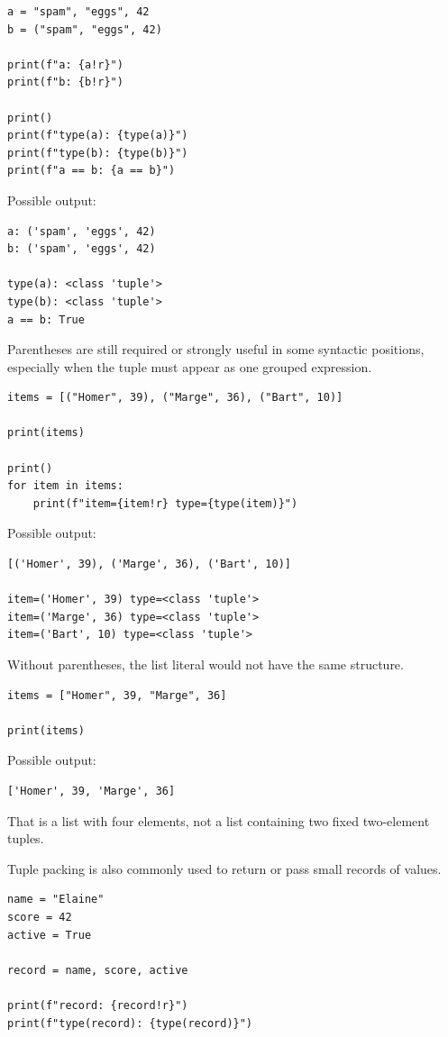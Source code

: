 \begin{verbatim}
a = "spam", "eggs", 42
b = ("spam", "eggs", 42)

print(f"a: {a!r}")
print(f"b: {b!r}")

print()
print(f"type(a): {type(a)}")
print(f"type(b): {type(b)}")
print(f"a == b: {a == b}")
\end{verbatim}

Possible output:

\begin{verbatim}
a: ('spam', 'eggs', 42)
b: ('spam', 'eggs', 42)

type(a): <class 'tuple'>
type(b): <class 'tuple'>
a == b: True
\end{verbatim}

Parentheses are still required or strongly useful in some syntactic positions, especially when the tuple must appear as one grouped expression.

\begin{verbatim}
items = [("Homer", 39), ("Marge", 36), ("Bart", 10)]

print(items)

print()
for item in items:
    print(f"item={item!r} type={type(item)}")
\end{verbatim}

Possible output:

\begin{verbatim}
[('Homer', 39), ('Marge', 36), ('Bart', 10)]

item=('Homer', 39) type=<class 'tuple'>
item=('Marge', 36) type=<class 'tuple'>
item=('Bart', 10) type=<class 'tuple'>
\end{verbatim}

Without parentheses, the list literal would not have the same structure.

\begin{verbatim}
items = ["Homer", 39, "Marge", 36]

print(items)
\end{verbatim}

Possible output:

\begin{verbatim}
['Homer', 39, 'Marge', 36]
\end{verbatim}

That is a list with four elements, not a list containing two fixed two-element tuples.

Tuple packing is also commonly used to return or pass small records of values.

\begin{verbatim}
name = "Elaine"
score = 42
active = True

record = name, score, active

print(f"record: {record!r}")
print(f"type(record): {type(record)}")
\end{verbatim}

